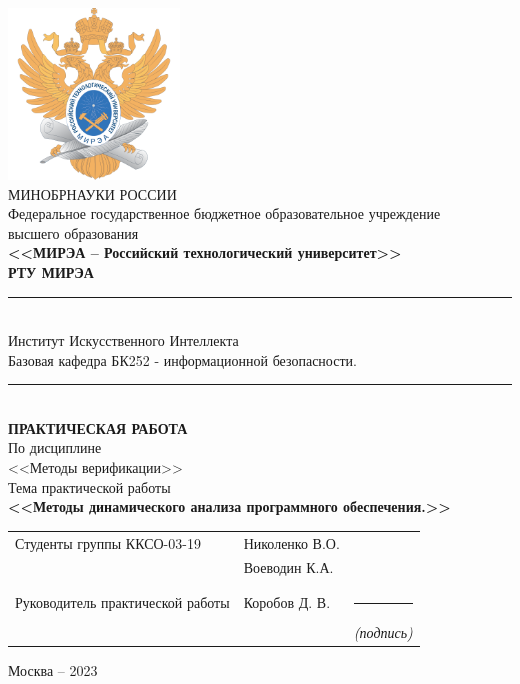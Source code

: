 \documentclass[utf8,14pt,a4paper,oneside,russian]{book}
\begin{document}
\thispagestyle{empty}
\small
\begin{center}
    \includegraphics[width=4.55cm]{logo_mirea}\\
    \MakeUppercase{Минобрнауки России}\\[1em]
    Федеральное государственное бюджетное образовательное учреждение\\
    высшего образования\\[0.5em]
    \textbf{<<МИРЭА -- Российский технологический университет>>}\\
    \textbf{РТУ МИРЭА}\\
    \rule{\textwidth}{0.75pt}\\
    Институт Искусственного Интеллекта\\
    Базовая кафедра БК252 - информационной безопасности.\\
    
    \rule{\textwidth}{0.75pt}\\[5em]
    \normalsize\MakeUppercase{\textbf{Практическая работа}}\small\\[0.5em]
    По дисциплине\\ <<Методы верификации>>\\[1.5em]
    Тема практической работы\\ \textbf{<<Методы динамического анализа программного обеспечения.>>} \\[3em]
    \begin{tabular}{p{7cm}p{6cm}c}
      Студенты группы ККСО-03-19       & Николенко В.О.                                          \\
                                       & Воеводин К.А.                                            \\
                                       &                                                         \\
      Руководитель практической работы & Коробов Д. В. & \rule{2cm}{0.75pt}                    \\[-0.5em]
                                       &                 & \footnotesize\textit{(подпись)}\small \\[5em]
    \end{tabular}
    \vfill
    Москва -- 2023
  \end{center}
  \normalsize
  \newpage
  
\end{document}
